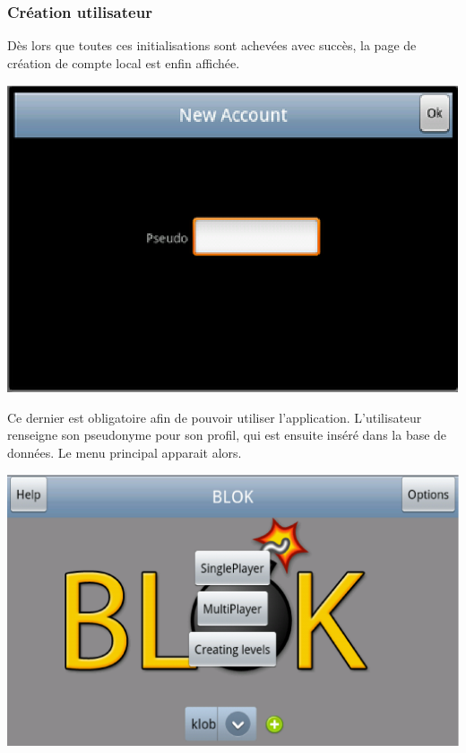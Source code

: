 	\subsubsection{Création utilisateur}
	Dès lors que toutes ces initialisations sont achevées avec succès, la page de
	création de compte local est enfin affichée.
		\begin{center}						
			\includegraphics[scale=0.6]{Developpement/Img/2.eps}
		\end{center} 
	Ce dernier est obligatoire afin de pouvoir utiliser l'application. L'utilisateur renseigne son pseudonyme
	pour son profil, qui est ensuite inséré dans la base de données.
	Le menu principal apparait alors.
	\begin{center}						
			\includegraphics[scale=0.3]{Developpement/Img/3.eps}
		\end{center} 
	
